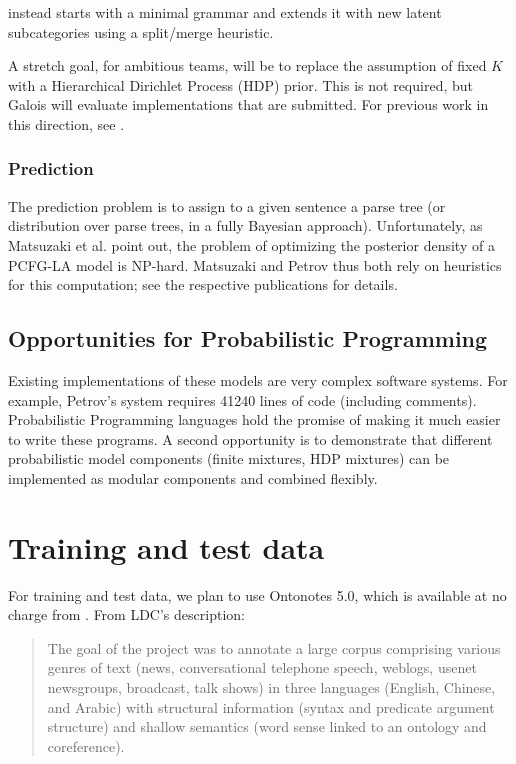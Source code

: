 \documentclass[english]{article}
\begin{document}
\citet{Petrov2006} instead starts with a minimal grammar and extends it with new latent subcategories using a split/merge heuristic. 

A stretch goal, for ambitious teams, will be to replace the assumption of fixed $K$ with a Hierarchical Dirichlet Process (HDP) prior. This is not required, but Galois will evaluate implementations that are submitted. For previous work in this direction, see \citet{Liang2007, Liang2009}.

\subsubsection*{Prediction}

The prediction problem is to assign to a given sentence a parse tree (or distribution over parse trees, in a fully Bayesian approach). Unfortunately, as Matsuzaki et al. point out, the problem of optimizing the posterior density of a PCFG-LA model is NP-hard. Matsuzaki and Petrov thus both rely on heuristics for this computation; see the respective publications for details.

\subsection{Opportunities for Probabilistic Programming}

Existing implementations of these models are very complex software systems. For example, Petrov's system requires 41240 lines of code (including comments). Probabilistic Programming languages hold the promise of making it much easier to write these programs. A second opportunity is to demonstrate that different probabilistic model components (finite mixtures, HDP mixtures) can be implemented as modular components and combined flexibly.

\section{Training and test data}

For training and test data, we plan to use Ontonotes 5.0, which is available at no charge from \citet{LDC2013}. From LDC's description: 
\begin{quote}
The goal of the project was to annotate a large corpus comprising various genres of text (news, conversational telephone speech, weblogs, usenet newsgroups, broadcast, talk shows) in three languages (English, Chinese, and Arabic) with structural information (syntax and predicate argument structure) and shallow semantics (word sense linked to an ontology and coreference).
\end{quote}
\end{document}
